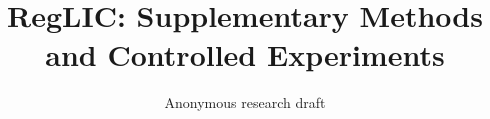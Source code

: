 \documentclass[10pt,twocolumn,letterpaper]{article}
\title{RegLIC: Supplementary Methods and Controlled Experiments}
\author{Anonymous research draft}
\begin{document}
\raggedbottom
\maketitle

\clearpage

\clearpage
{\small}
\end{document}
